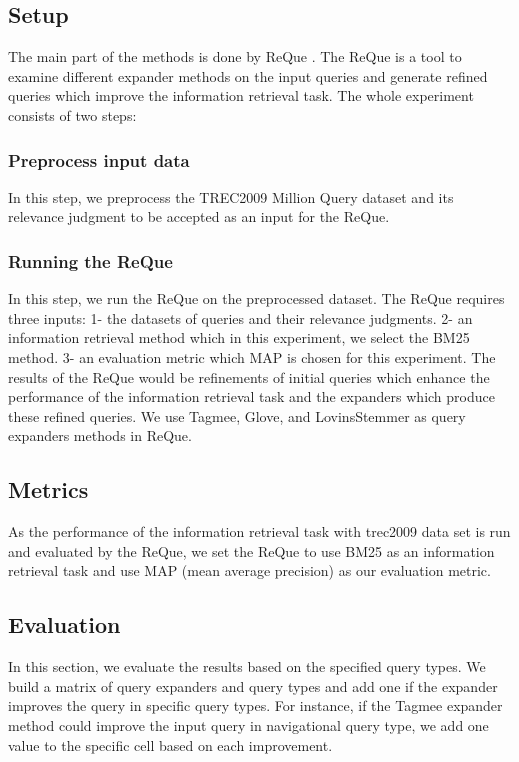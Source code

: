 \documentclass[sigconf]{acmart}
\begin{document}
\subsection{Setup}
The main part of the methods is done by ReQue \cite{tamannaee2020reque}. The ReQue is a tool to examine different expander methods on the input queries and generate refined queries which improve the information retrieval task. The whole experiment consists of two steps:  

\subsubsection{Preprocess input data}
In this step, we preprocess the TREC2009 Million Query dataset and its relevance judgment to be accepted as an input for the ReQue.

\subsubsection{Running the ReQue}
In this step, we run the ReQue on the preprocessed dataset. The ReQue requires three inputs: 1- the datasets of queries and their relevance judgments. 2- an information retrieval method which in this experiment, we select the BM25 method. 3- an evaluation metric which MAP is chosen for this experiment. The results of the ReQue would be refinements of initial queries which enhance the performance of the information retrieval task and the expanders which produce these refined queries. We use Tagmee, Glove, and LovinsStemmer as query expanders methods in ReQue.

\subsection{Metrics}
As the performance of the information retrieval task with trec2009 data set is run and evaluated by the ReQue, we set the ReQue to use BM25 \cite{enwiki:1082128332} as an information retrieval task and use MAP (mean average precision) \cite{enwiki:1077036698} as our evaluation metric.
\subsection{Evaluation}
In this section, we evaluate the results based on the specified query types. We build a matrix of query expanders and query types and add one if the expander improves the query in specific query types. For instance, if the Tagmee expander method could improve the input query in navigational query type, we add one value to the specific cell based on each improvement. 
\end{document}
